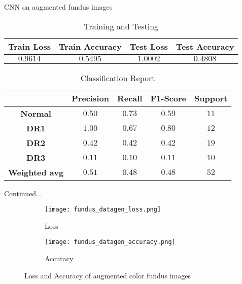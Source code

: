 \documentclass{beamer}
\begin{document}
\begin{frame}{CNN on augmented fundus images}
\begin{table}
\caption{Training and Testing}
\begin{tabular}{c c c c}
\hline
\textbf{Train Loss} & \textbf{Train Accuracy} & \textbf{Test Loss} & \textbf{Test Accuracy}\\
\hline
$0.9614$ & $0.5495$ & $1.0002$ & $0.4808$\\
\hline
\end{tabular}
\end{table}

\begin{table}
\caption{Classification Report}
\begin{tabular}{c c c c c}
\hline
\textbf{} & \textbf{Precision} & \textbf{Recall} & \textbf{F1-Score} & \textbf{Support} \\
\hline
\textbf{Normal} & $0.50$ & $0.73$ & $0.59$ & $11$\\
\textbf{DR1} & $1.00$ & $0.67$ & $0.80$ & $12$\\
\textbf{DR2} & $0.42$ & $0.42$ & $0.42$ & $19$\\
\textbf{DR3} & $0.11$ & $0.10$ & $0.11$ & $10$\\
\textbf{Weighted avg} & $0.51$ & $0.48$ & $0.48$ & $52$\\
\hline
\end{tabular}
\end{table}
\end{frame}

\begin{frame}{Continued...}
\begin{figure}[H]
\centering
\begin{subfigure}[h]{0.45\linewidth}
\texttt{[image: fundus\_datagen\_loss.png]}
\caption{Loss}
\label{fig:a}
\end{subfigure}
\quad
\begin{subfigure}[h]{0.45\linewidth}
\texttt{[image: fundus\_datagen\_accuracy.png]}
\caption{Accuracy}
\label{fig:b}
\end{subfigure}
\caption{Loss and Accuracy of augmented color fundus images}
\label{fig: Image3}
\end{figure}
\end{frame}
\end{document}
